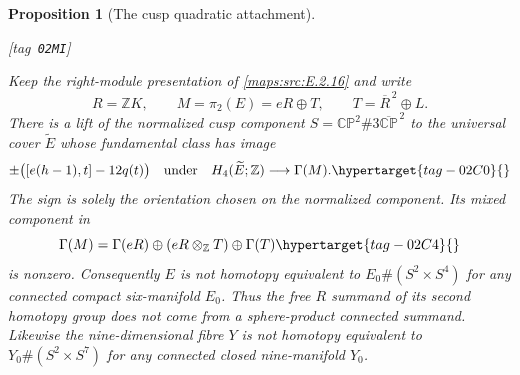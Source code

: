 \documentclass[11pt,a4paper]{article}
\makeatletter
\numberwithin{equation}{section}
\newtheorem{proposition}[proposition]{Proposition}
\theoremstyle{definition}
\newcommand{\StatementRecord}[4]{{\upshape\footnotesize[tag~\texttt{#3}]}\enspace\ignorespaces}
\newcommand{\SeriesRefText}[1]{\ifcsname SRef@#1\endcsname\csname SRef@#1\endcsname\else\textbf{UNRESOLVED}\fi}
\newcommand{\SeriesRef}[1]{\ifmmode\text{\SeriesRefText{#1}}\else\SeriesRefText{#1}\fi}
\makeatother
\begin{document}
\begin{proposition}[The cusp quadratic attachment]\hypertarget{tag-02MI}{}\label{maps:src:E.2.18}
\StatementRecord{maps:src:E.2.18}{proved}{02MI}{\cref{maps:src:E.2.16}, \eqref{maps:eq:E.P6}, \SeriesRef{maps:src:D.1.9}, \cref{maps:src:E.2.12}, \eqref{maps:eq:E.C12}, \eqref{maps:eq:E.Q4}, \eqref{maps:eq:E.Q5}, \eqref{maps:eq:E.Q3}, \eqref{maps:eq:E.Q7}, \eqref{maps:eq:E.Q6}, \eqref{maps:eq:E.C3}, \eqref{maps:eq:E.Q8}, \cref{maps:src:E.2.17}, \eqref{maps:eq:E.P2}, \eqref{maps:eq:E.P3}, \eqref{maps:eq:E.P4}, \eqref{maps:eq:E.Q11}, \eqref{maps:eq:E.Q10}, \eqref{maps:eq:E.Q12}; \cite[Theorems 1 and 5]{mapsWhitehead50}}


Keep the right-module presentation of \ref{maps:src:E.2.16} and write
\[
 R=\mathbb ZK,\qquad M=\pi_2(E)=eR\oplus T,
 \qquad T=\overline R^{\,2}\oplus L.
\]
There is a lift of the normalized cusp component
$S=\mathbb {CP}^2\#3\overline{\mathbb {CP}}^{\,2}$ to the
universal cover $\widetilde E$ whose fundamental class has image
\begin{equation}
 \pm\bigl([e(h-1),t]-12q(t)\bigr)
       \quad\hbox{under}\quad
 H_4(\widetilde E;\mathbb Z)\longrightarrow\Gamma(M).
 \hypertarget{tag-02C0}{}\label{maps:eq:E.Q1}
\end{equation}
The sign is solely the orientation chosen on the normalized
component.  Its mixed component in
\begin{equation}
 \Gamma(M)=\Gamma(eR)\oplus(eR\otimes_{\mathbb Z}T)
                                      \oplus\Gamma(T)
 \hypertarget{tag-02C4}{}\label{maps:eq:E.Q2}
\end{equation}
is nonzero.  Consequently $E$ is not homotopy equivalent to
$E_0\#(S^2\times S^4)$ for any connected compact six-manifold
$E_0$.  Thus the free $R$ summand of its second homotopy group
does not come from a sphere-product connected summand.
Likewise the nine-dimensional fibre $Y$ is not
homotopy equivalent to $Y_0\#(S^2\times S^7)$ for any
connected closed nine-manifold $Y_0$.

\end{proposition}
\end{document}
